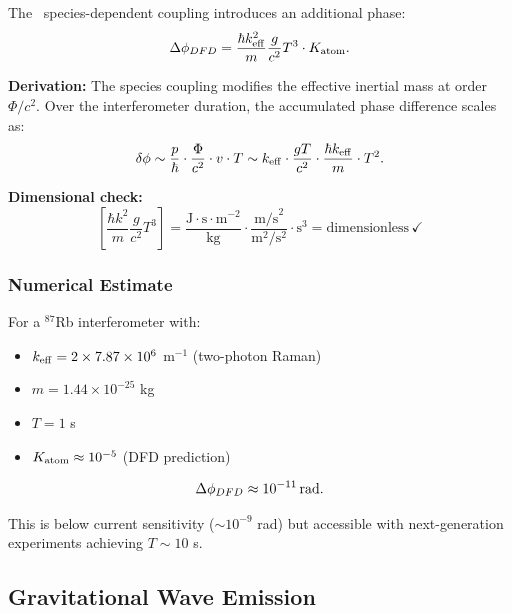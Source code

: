 The \DFD\ species-dependent coupling introduces an additional phase:
\begin{equation}
\Delta\phi_{DFD} = \frac{\hbar k_{\rm eff}^2}{m}\frac{g}{c^2}T^3 \cdot K_{\rm atom}.
\end{equation}

\textbf{Derivation:} The species coupling modifies the effective inertial 
mass at order $\Phi/c^2$. Over the interferometer duration, the accumulated 
phase difference scales as:
\begin{equation}
\delta\phi \sim \frac{p}{\hbar}\cdot\frac{\Phi}{c^2}\cdot v\cdot T \sim k_{\rm eff}\cdot\frac{gT}{c^2}\cdot\frac{\hbar k_{\rm eff}}{m}\cdot T^2.
\end{equation}

\textbf{Dimensional check:}
\begin{equation}
\left[\frac{\hbar k^2}{m}\frac{g}{c^2}T^3\right] = \frac{\text{J}\cdot\text{s}\cdot\text{m}^{-2}}{\text{kg}}\cdot\frac{\text{m/s}^2}{\text{m}^2/\text{s}^2}\cdot\text{s}^3 = \text{dimensionless}\,\checkmark
\end{equation}

\subsubsection{Numerical Estimate}

For a $^{87}$Rb interferometer with:
\begin{itemize}
\item $k_{\rm eff} = 2 \times 7.87 \times 10^6$ m$^{-1}$ (two-photon Raman)
\item $m = 1.44 \times 10^{-25}$ kg
\item $T = 1$ s
\item $K_{\rm atom} \approx 10^{-5}$ (DFD prediction)
\end{itemize}

\begin{equation}
\Delta\phi_{DFD} \approx 10^{-11}\,\text{rad}.
\end{equation}

This is below current sensitivity ($\sim 10^{-9}$ rad) but accessible 
with next-generation experiments achieving $T \sim 10$ s.

\subsection{Gravitational Wave Emission}\label{app:gw_derivation}

